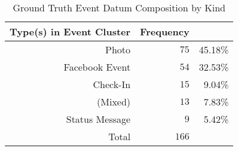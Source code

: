 \begin{table}[htp]
	\begin{center}
	\caption{Ground Truth Event Datum Composition by Kind}
	\label{tab:ch4_table_gt_comp_by_type}
		\begin{tabular}{r r r}
		\toprule
			{Type(s) in Event Cluster} & {Frequency} & {}\\
			\midrule
			Photo & $75$ & 45.18\%\\
			Facebook Event & $54$ & 32.53\%\\
			Check-In & $15$ & 9.04\%\\
			(Mixed) & $13$ & 7.83\%\\
			Status Message & $9$ & 5.42\%\\
			\midrule Total & $166$ & \\
		\bottomrule
		\end{tabular}
	\end{center}
\end{table}